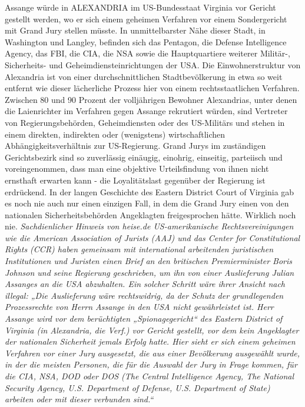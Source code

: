 \begin{multicols}{2}
{\textCR
Assange würde in ALEXANDRIA im US-Bundesstaat Virginia vor Gericht gestellt werden, wo er sich einem geheimen Verfahren vor einem Sondergericht mit Grand
Jury stellen müsste. In unmittelbarster Nähe dieser
Stadt, in Washington und Langley, befinden sich das
Pentagon, die Defense Intelligence Agency, das FBI, die
CIA, die NSA sowie die Hauptquartiere weiterer Militär-,
Sicherheits- und Geheimdiensteinrichtungen der USA.
Die Einwohnerstruktur von Alexandria ist von einer
durchschnittlichen Stadtbevölkerung in etwa so weit
entfernt wie dieser lächerliche Prozess hier von einem
rechtsstaatlichen Verfahren. Zwischen 80 und 90 Prozent
der volljährigen Bewohner Alexandrias, unter denen die
Laienrichter im Verfahren gegen Assange rekrutiert würden, sind Vertreter von Regierungsbehörden, Geheimdiensten oder des US-Militärs und stehen in einem direkten, indirekten oder (wenigstens) wirtschaftlichen
Abhängigkeitsverhältnis zur US-Regierung. Grand Jurys
im zuständigen Gerichtsbezirk sind so zuverlässig einäugig, einohrig, einseitig, parteiisch und voreingenommen, dass man eine objektive Urteilsfindung von ihnen nicht ernsthaft erwarten kann - die Loyalitätslast
gegenüber der Regierung ist erdrückend. In der langen
Geschichte des Eastern District Court of Virginia gab es
noch nie auch nur einen einzigen Fall, in dem die Grand
Jury einen von den nationalen Sicherheitsbehörden Angeklagten freigesprochen hätte. Wirklich noch nie.
\textCR
\textit{Sachdienlicher Hinweis von heise.de
US-amerikanische Rechtsvereinigungen wie die American Association of Jurists (AAJ) und das Center for Constitutional Rights (CCR) haben gemeinsam mit international arbeitenden juristischen Institutionen und Juristen
einen Brief an den britischen Premierminister Boris Johnson und seine Regierung geschrieben, um ihn von einer
Auslieferung Julian Assanges an die USA abzuhalten. Ein
solcher Schritt wäre ihrer Ansicht nach illegal:
„Die Auslieferung wäre rechtswidrig, da der Schutz der
grundlegenden Prozessrechte von Herrn Assange in den
USA nicht gewährleistet ist. Herr Assange wird vor dem
berüchtigten „Spionagegericht“ des Eastern District of
Virginia (in Alexandria, die Verf.) vor Gericht gestellt, vor
dem kein Angeklagter der nationalen Sicherheit jemals
Erfolg hatte. Hier sieht er sich einem geheimen Verfahren vor einer Jury ausgesetzt, die aus einer Bevölkerung
ausgewählt wurde, in der die meisten Personen, die für
die Auswahl der Jury in Frage kommen, für die CIA, NSA,
DOD oder DOS (The Central Intelligence Agency, The National Security Agency, U.S. Department of Defense, U.S.
Department of State) arbeiten oder mit dieser verbunden
sind.“}}


\end{multicols}
